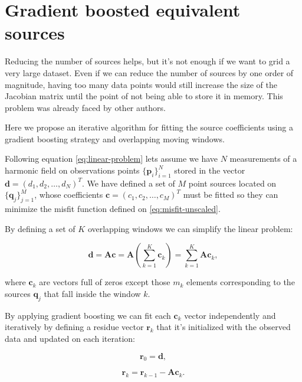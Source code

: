 \documentclass[twocolumn]{article}
\begin{document}

\section{Gradient boosted equivalent sources}

Reducing the number of sources helps, but it's not enough if we want to grid
a very large dataset.
Even if we can reduce the number of sources by one order of magnitude, having
too many data points would still increase the size of the Jacobian matrix until
the point of not being able to store it in memory.
This problem was already faced by other authors.

Here we propose an iterative algorithm for fitting the source coefficients
using a gradient boosting \citep{friedman2002} strategy and overlapping moving
windows.

Following equation \ref{eq:linear-problem} lets assume we have $N$ measurements
of a harmonic field on observations points $\{\mathbf{p}_i\}_{i=1}^{N}$ stored in
the vector $\mathbf{d} = (d_1, d_2, \ldots, d_N)^T$. We have defined a set of
$M$ point sources located on $\{\mathbf{q}_j\}_{j=1}^{M}$, whose coefficients
$\mathbf{c} = (c_1, c_2, \ldots, c_M)^T$ must be fitted so they can minimize
the misfit function defined on \ref{eq:misfit-unscaled}.

By defining a set of $K$ overlapping windows we can simplify the linear problem:

\begin{equation}
    \mathbf{d}
    = \mathbf{A} \mathbf{c}
    = \mathbf{A} \left( \sum_{k=1}^K \mathbf{c}_k \right)
    = \sum_{k=1}^K \mathbf{A} \mathbf{c}_k,
\end{equation}

\noindent where $\mathbf{c}_k$ are vectors full of zeros except those $m_k$
elements corresponding to the sources $\mathbf{q}_j$ that fall inside the
window $k$.

By applying gradient boosting we can fit each $\mathbf{c}_k$ vector
independently and iteratively by defining a residue vector $\mathbf{r}_k$ that
it's initialized with the observed data and updated on each iteration:

\begin{equation}
    \mathbf{r}_0 = \mathbf{d},
\end{equation}

\begin{equation}
    \mathbf{r}_k = \mathbf{r}_{k-1} - \mathbf{A}\mathbf{c}_k.
    \label{eq:residue}
\end{equation}
\end{document}
